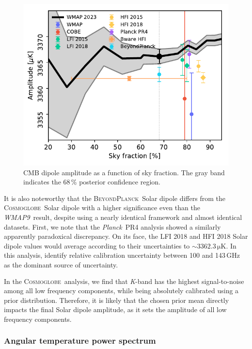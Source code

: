 \documentclass[twocolumn]{../../common/aa}
\def\WMAPnine{\emph{WMAP9}}
\def\Planck{\emph{Planck}}
\newcommand{\bp}{\textsc{BeyondPlanck}}
\newcommand{\cosmoglobe}{\textsc{Cosmoglobe}}
\newcommand{\K}[0]{\textit K}
\begin{document}
\begin{figure}
	\includegraphics[width=\columnwidth]{figures/dip_amplitude.pdf}
	\caption{CMB dipole amplitude as a function of sky fraction. The gray band indicates the 68\,\% posterior confidence region.}
	\label{fig:dip_amp}
\end{figure}

It is also noteworthy that the \bp\ Solar dipole differs from the \cosmoglobe\ Solar dipole with a higher significance even than the \WMAPnine\ result, despite using a nearly identical framework and almost identical datasets. First, we note that the \Planck\ PR4 analysis \citep{npipe} showed a similarly apparently paradoxical discrepancy. On its face, the LFI 2018 and HFI 2018 Solar dipole values would average according to their uncertainties to $\sim3362.3\,\mathrm{\mu K}$. In this analysis, \citet{npipe} identify relative calibration uncertainty between 100 and 143\,GHz as the dominant source of uncertainty.

In the \cosmoglobe\ analysis, we find that \K-band has the highest signal-to-noise among all low frequency components, while being absolutely calibrated using a prior distribution. Therefore, it is likely that the chosen prior mean directly impacts the final Solar dipole amplitude, as it sets the amplitude of all low frequency components. 





\subsubsection{Angular temperature power spectrum}
\label{sec:cls}
\end{document}
